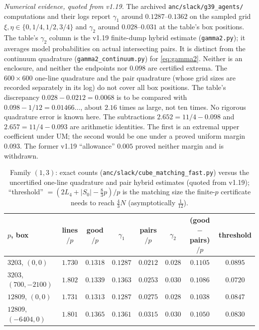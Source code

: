 \emph{Numerical evidence, quoted from v1.19.}
The archived \texttt{anc/slack/g39\_agents/} computations and their logs report $\gamma_1$ around $0.1287$--$0.1362$
on the sampled grid $\xi,\eta\in\{0,1/4,1/2,3/4\}$ and $\gamma_2$ around $0.028$--$0.031$ at the table's box positions.
The table's $\gamma_2$ column is the v1.19 finite-dump hybrid estimate (\texttt{gamma2.py}); it averages model probabilities on actual intersecting pairs.  It is distinct from the continuum quadrature (\texttt{gamma2\_continuum.py}) for \eqref{eq:gamma2}.  Neither is an enclosure, and neither the endpoints nor $0.098$ are certified extrema.
The $600\times600$ one-line quadrature and the pair quadrature (whose grid sizes are recorded separately in its log) do not cover all box positions.
The table's discrepancy $0.028-0.0212=0.0068$ is to be compared with $0.098-1/12=0.01466\ldots$, about $2.16$ times as large,
not ten times.  No rigorous quadrature error is known here.
The subtractions $2.652=11/4-0.098$ and $2.657=11/4-0.093$ are arithmetic identities.
The first is an extremal upper coefficient under UM; the second would be one under a proved uniform margin $0.093$.
The former v1.19 ``allowance'' $0.005$ proved neither margin and is withdrawn.

\begin{table}[ht]\centering\scriptsize
\begin{tabular}{lccccccc}
\toprule
$p$, box & lines$/p$ & good$/p$ & $\gamma_1$ & pairs$/p$ & $\gamma_2$ & (good$-$pairs)$/p$ & threshold\\
\midrule
$3203$, $(0,0)$        & $1.730$ & $0.1318$ & $0.1287$ & $0.0212$ & $0.028$ & $0.1105$ & $0.0895$\\
$3203$, $(700,-2100)$  & $1.802$ & $0.1339$ & $0.1363$ & $0.0253$ & $0.030$ & $0.1086$ & $0.0720$\\
$12809$, $(0,0)$       & $1.731$ & $0.1313$ & $0.1287$ & $0.0275$ & $0.028$ & $0.1038$ & $0.0847$\\
$12809$, $(-6404,0)$   & $1.801$ & $0.1365$ & $0.1361$ & $0.0315$ & $0.030$ & $0.1050$ & $0.0830$\\
\bottomrule
\end{tabular}
\caption{Family $(1,3)$: exact counts (\texttt{anc/slack/cube\_matching\_fast.py}) versus the uncertified one-line quadrature and pair hybrid estimates (quoted from v1.19); ``threshold'' $=(2L_4+|S_0|-\tfrac83p)/p$ is
the matching size the finite-$p$ certificate needs to reach $\tfrac43N$ (asymptotically $\tfrac1{12}$).}\label{tab:strong}
\end{table}

